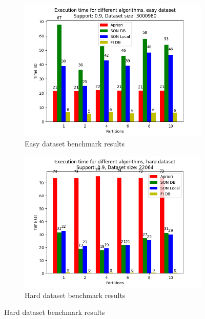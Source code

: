 \documentclass[a4paper]{article}
\begin{document}
	\begin{figure}[h]
		\centering
		\begin{subfigure}[b]{\textwidth}
			\centering
			\includegraphics[width=\textwidth]{1_easy_0,9_1_partitions.png}
         	\caption{Easy dataset benchmark results}
         	\label{fig:1-09sup-1ds-par-e}
		\end{subfigure}
		\hfill		
		\begin{subfigure}[b]{\textwidth}
			\centering
			\includegraphics[width=\textwidth]{1_hard_0,9_1_partitions.png}
         	\caption{Hard dataset benchmark results}
         	\label{fig:1-09sup-1ds-par-h}
		\end{subfigure}
		\hfill
		
	\end{figure}
\end{document}
